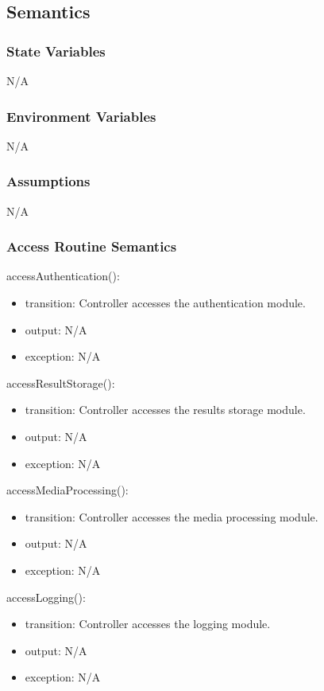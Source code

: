 \documentclass[12pt, titlepage]{article}
\begin{document}
\subsection{Semantics}

\subsubsection{State Variables}
N/A

\subsubsection{Environment Variables}
N/A

\subsubsection{Assumptions}
N/A

\subsubsection{Access Routine Semantics}

\noindent accessAuthentication():
\begin{itemize}
\item transition: Controller accesses the authentication module.
\item output: N/A
\item exception: N/A
\end{itemize}

\noindent accessResultStorage():
\begin{itemize}
\item transition: Controller accesses the results storage module.
\item output: N/A
\item exception: N/A
\end{itemize}

\noindent accessMediaProcessing():
\begin{itemize}
\item transition: Controller accesses the media processing module.
\item output: N/A
\item exception: N/A
\end{itemize}

\noindent accessLogging():
\begin{itemize}
\item transition: Controller accesses the logging module.
\item output: N/A
\item exception: N/A
\end{itemize}
\end{document}
